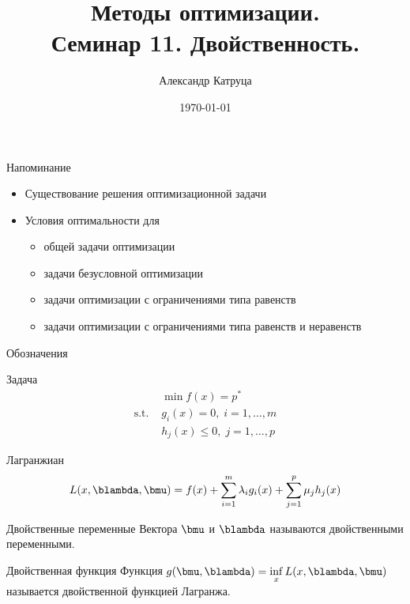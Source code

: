 \documentclass[12pt]{beamer}
\title[Семинар 11]{Методы оптимизации. \\
 Семинар 11. Двойственность.}
\author{Александр Катруца}
\institute{Московский физико-технический институт\\
Факультет Управления и Прикладной Математики}
\date{\today}
\begin{document}
\begin{frame}
\maketitle
\end{frame}

\begin{frame}{Напоминание}
\begin{itemize}
\item Существование решения оптимизационной задачи 
\item Условия оптимальности для
\begin{itemize}
\item общей задачи оптимизации
\item задачи безусловной оптимизации
\item задачи оптимизации с ограничениями типа равенств
\item задачи оптимизации с ограничениями типа равенств и неравенств
\end{itemize}
\end{itemize}
\end{frame}

\begin{frame}{Обозначения}
\small
\begin{block}{Задача}
\vspace{-5mm}
\begin{equation*}
\begin{split}
& \min\limits f(x) = p^*\\
\text{s.t. } & g_i(x) = 0, \; i = 1,\ldots,m\\
& h_j(x) \leq 0, \; j = 1,\ldots, p
\end{split}
\end{equation*}
\end{block}

\begin{block}{Лагранжиан}
\vspace{-2mm}
\begin{equation*}
L(x, \blambda, \bmu) = f(x) + \sum\limits_{i=1}^m\lambda_i g_i(x) + \sum\limits_{j=1}^p \mu_j h_j(x)
\vspace{-2mm}
\end{equation*}
\end{block}

\begin{block}{Двойственные переменные}
Вектора $\bmu$ и $\blambda$ называются двойственными переменными.
\end{block}

\begin{block}{Двойственная функция}
Функция $g(\bmu, \blambda) = \inf\limits_x L(x, \blambda, \bmu)$ называется двойственной функцией Лагранжа.
\end{block}

\end{frame}
\end{document}
